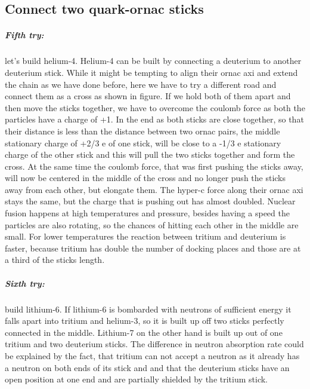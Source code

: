 \subsection{Connect two quark-ornac sticks}
\subparagraph{
Fifth try:} let's build helium-4. Helium-4 can be built by connecting a deuterium to another deuterium stick. While it might be tempting to align their ornac axi and extend the chain as we have done before, here we have to try a different road and connect them as a cross as shown in figure. If we hold both of them apart and then move the sticks together, we have to overcome the coulomb force as both the particles have a charge of +1. In the end as both sticks are close together, so that their distance is less than the distance between two ornac pairs,  the middle stationary charge of +2/3 e of one stick, will be close to a -1/3 e stationary charge of the other stick and this will pull the two sticks together and form the cross. At the same time the coulomb force, that was first pushing the sticks away, will now be centered in the middle of the cross and no longer push the sticks away from each other, but elongate them. The hyper-c force along their ornac axi stays the same, but the charge that is pushing out has almost doubled. 
Nuclear fusion happens at high temperatures and pressure, besides having a speed the particles are also rotating, so the chances of hitting each other in the middle are small. For lower temperatures the reaction between tritium and deuterium is faster, because tritium has double the number of docking places and those are at a third of the sticks length.

\subparagraph{Sixth try:} 
build lithium-6. If lithium-6 is bombarded with neutrons of sufficient energy it falls apart into tritium and helium-3, so it is built up off two sticks perfectly connected in the middle. Lithium-7 on the other hand is built up out of one tritium and two deuterium sticks. The difference in neutron absorption rate could be explained by the fact, that tritium can not accept a neutron as it already has a neutron on both ends of its stick and and that the deuterium sticks have an open position at one end and are partially shielded by the tritium stick.


